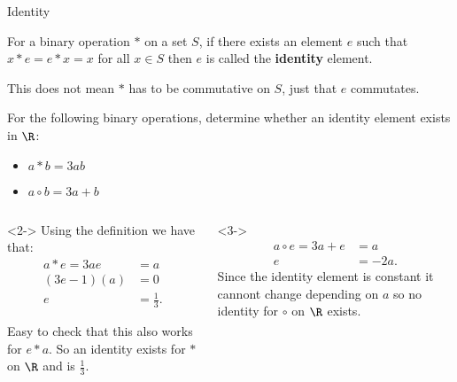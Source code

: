 \documentclass[8pt]{beamer}
\begin{document}
\begin{frame}[shrink]{Identity}
	\begin{definition}
		For a binary operation $*$ on a set  $S$, if there exists an element $e$ such that $x*e=e*x=x$ for all  $x\in S$ then $e $ is called the \textbf{identity} element. 
	\end{definition}

	\alert<1>{This does not mean $*$ has to be commutative on  $S$, just that  $e$ commutates.}

\begin{problem}
	For the following binary operations, determine whether an identity element exists in $\R$:
	\begin{itemize}
		\item $a*b= 3ab$
		\item  $ a \circ b = 3a+b$
	\end{itemize}

\end{problem}
\begin{columns}[T]
	\begin{column}{.6\linewidth}
		
\begin{solution}<2->
	Using the definition we have that: 
	\begin{align*}
		a*e=3ae&=a \\
		(3e-1)(a)&=0 \\
		e&=\frac{1}{3}
	.\end{align*}

	Easy to check that this also works for $e*a$. So an identity exists for  $*$ on  $\R$ and is $\frac{1}{3}$.
\end{solution}

	\end{column}
\begin{column}{.4\linewidth}
	\begin{solution}<3->
	\begin{align*}
		a\circ e = 3a+e&= a \\
		e &= -2a 
	.\end{align*}
	Since the identity element is constant it cannont change depending on $a$ so no identity for  $\circ$ on  $\R$ exists.
\end{solution}
\end{column}
\end{columns}


\end{frame}
\end{document}
